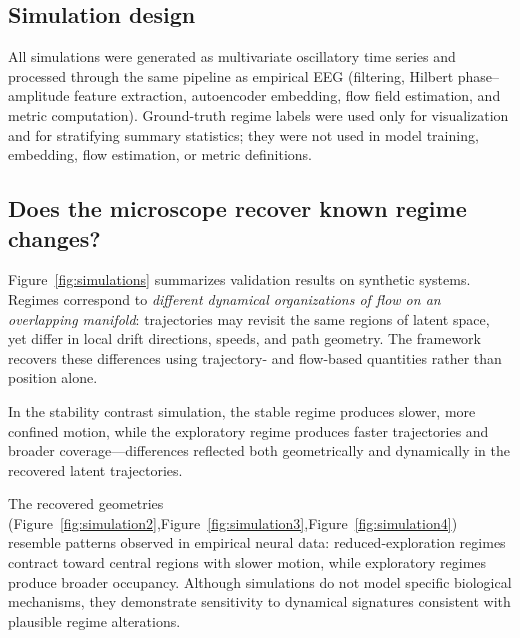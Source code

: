 \documentclass[5p,twocolumn,authoryear]{elsarticle}
\begin{document}
\subsection{Simulation design}

All simulations were generated as multivariate oscillatory time series and processed through the same pipeline as empirical EEG (filtering, Hilbert phase--amplitude feature extraction, autoencoder embedding, flow field estimation, and metric computation). Ground-truth regime labels were used only for visualization and for stratifying summary statistics; they were not used in model training, embedding, flow estimation, or metric definitions.

\subsection{Does the microscope recover known regime changes?}
\label{sec:sim_validation}

Figure~\ref{fig:simulations} summarizes validation results on synthetic systems. Regimes correspond to \emph{different dynamical organizations of flow on an overlapping manifold}: trajectories may revisit the same regions of latent space, yet differ in local drift directions, speeds, and path geometry. The framework recovers these differences using trajectory- and flow-based quantities rather than position alone.

In the stability contrast simulation, the stable regime produces slower, more confined motion, while the exploratory regime produces faster trajectories and broader coverage---differences reflected both geometrically and dynamically in the recovered latent trajectories.

The recovered geometries (Figure~\ref{fig:simulation2},Figure~\ref{fig:simulation3},Figure~\ref{fig:simulation4}) resemble patterns observed in empirical neural data: reduced-exploration regimes contract toward central regions with slower motion, while exploratory regimes produce broader occupancy. Although simulations do not model specific biological mechanisms, they demonstrate sensitivity to dynamical signatures consistent with plausible regime alterations.
\end{document}
